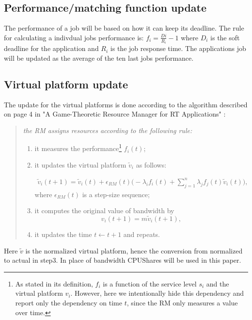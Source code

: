 \documentclass[nobiblatex]{LTHthesis}
\begin{document}
\subsection{Performance/matching function update}
The performance of a job will be based on how it can keep its deadline. The rule for calculating a indivdual jobs performance is:
$f_{i}=\frac{D{i}}{R_{i}}-1$ where $D_{i}$ is the soft deadline for the application and $R_{i}$ is the job response time.
The applications job will be updated as the average of the ten last jobs performance.

\subsection{Virtual platform update}

The update for the virtual platforms is done according to the algorithm described on page 4 in "A Game-Theoretic Resource Manager for RT Applications" \cite{gtrm}:


\begin{quotation}
\em
	the RM assigns resources according to
	the following rule:
	\begin{enumerate}

	\item it measures the performance\footnote{As stated in its definition, $f_i$ is a function of the service level $s_i$ and the virtual platform $v_i$. However, here we intentionally hide this dependency and report only the dependency on time $t$, since the RM only measures a value over time.} $f_i(t)$;  
	\item it updates the virtual platform $\tilde{v}_{i}$ as follows:

		\begin{multline}
		  \tilde{v}_i(t+1) =\tilde{v}_i(t) + \epsilon_{ RM}(t)\Big(- \lambda_i f_i(t) + \sum_{j=1}^n \lambda_j f_j(t) \tilde{v}_i(t)\Big),
		  \label{eq:RecursionForResources}
		\end{multline}
		  where $\epsilon_{ RM}(t)$ is a step-size sequence;
	\item it computes the original value of bandwidth by $$v_i(t+1) = m \tilde{v}_i(t+1),$$
	\item it updates the time $t\leftarrow t+1$ and repeats.
	\end{enumerate}
	
	
\end{quotation}

Here $\tilde{v}$ is the normalized virtual platform, hence the conversion from normalized to actual in step3. In place of bandwidth CPUShares will be used in this paper.
\end{document}
